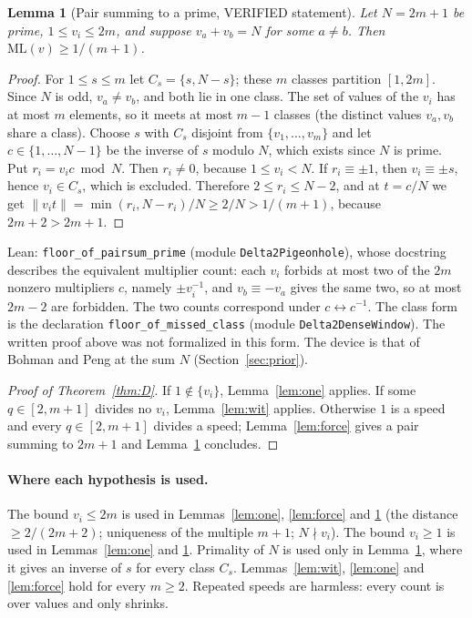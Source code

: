 \documentclass[11pt]{article}
\newtheorem{lemma}{Lemma}
\theoremstyle{remark}
\newcommand{\norm}[1]{\lVert #1\rVert}
\newcommand{\ML}{\mathrm{ML}}
\begin{document}
\begin{lemma}[Pair summing to a prime, VERIFIED statement]\label{lem:pair}
Let $N=2m+1$ be prime, $1\le v_i\le 2m$, and suppose $v_a+v_b=N$ for some $a\ne b$. Then $\ML(v)\ge1/(m+1)$.
\end{lemma}
\begin{proof}
For $1\le s\le m$ let $C_s=\{s,N-s\}$; these $m$ classes partition $[1,2m]$. Since $N$ is odd, $v_a\ne v_b$, and both lie in one class. The set of values of the $v_i$ has at most $m$ elements, so it meets at most $m-1$ classes (the distinct values $v_a,v_b$ share a class). Choose $s$ with $C_s$ disjoint from $\{v_1,\dots,v_m\}$ and let $c\in\{1,\dots,N-1\}$ be the inverse of $s$ modulo $N$, which exists since $N$ is prime. Put $r_i=v_ic\bmod N$. Then $r_i\ne0$, because $1\le v_i<N$. If $r_i\equiv\pm1$, then $v_i\equiv\pm s$, hence $v_i\in C_s$, which is excluded. Therefore $2\le r_i\le N-2$, and at $t=c/N$ we get $\norm{v_it}=\min(r_i,N-r_i)/N\ge 2/N>1/(m+1)$, because $2m+2>2m+1$.
\end{proof}
\noindent Lean: \texttt{floor\_of\_pairsum\_prime} (module \texttt{Delta2Pigeonhole}), whose docstring describes the equivalent multiplier count: each $v_i$ forbids at most two of the $2m$ nonzero multipliers $c$, namely $\pm v_i^{-1}$, and $v_b\equiv-v_a$ gives the same two, so at most $2m-2$ are forbidden. The two counts correspond under $c\leftrightarrow c^{-1}$. The class form is the declaration \texttt{floor\_of\_missed\_class} (module \texttt{Delta2DenseWindow}). The written proof above was not formalized in this form. The device is that of Bohman and Peng at the sum $N$ (Section~\ref{sec:prior}).

\begin{proof}[Proof of Theorem~\ref{thm:D}]
If $1\notin\{v_i\}$, Lemma~\ref{lem:one} applies. If some $q\in[2,m+1]$ divides no $v_i$, Lemma~\ref{lem:wit} applies. Otherwise $1$ is a speed and every $q\in[2,m+1]$ divides a speed; Lemma~\ref{lem:force} gives a pair summing to $2m+1$ and Lemma~\ref{lem:pair} concludes.
\end{proof}

\paragraph{Where each hypothesis is used.} The bound $v_i\le 2m$ is used in Lemmas~\ref{lem:one}, \ref{lem:force} and \ref{lem:pair} (the distance $\ge2/(2m+2)$; uniqueness of the multiple $m+1$; $N\nmid v_i$). The bound $v_i\ge1$ is used in Lemmas~\ref{lem:one} and \ref{lem:pair}. Primality of $N$ is used only in Lemma~\ref{lem:pair}, where it gives an inverse of $s$ for every class $C_s$. Lemmas~\ref{lem:wit}, \ref{lem:one} and \ref{lem:force} hold for every $m\ge2$. Repeated speeds are harmless: every count is over values and only shrinks.
\end{document}

